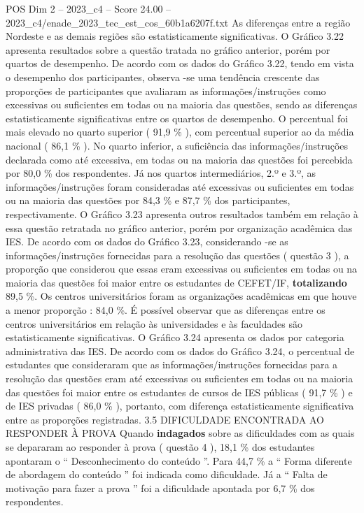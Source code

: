 \begin{textsample}{POS Dim 2 – 2023\_c4 – Score 24.00 – 2023\_c4/enade\_2023\_tec\_est\_cos\_60b1a6207f.txt}
As diferenças entre a região Nordeste e as demais regiões são estatisticamente significativas.
O Gráfico 3.22 apresenta resultados sobre a questão tratada no gráfico anterior, porém por quartos de desempenho.
De acordo com os dados do Gráfico 3.22, tendo em vista o desempenho dos participantes, observa -se uma tendência crescente das proporções de participantes que avaliaram as informações/instruções como excessivas ou suficientes em todas ou na maioria das questões, sendo as diferenças estatisticamente significativas entre os quartos de desempenho.
O percentual foi mais elevado no quarto superior ( 91,9 \% ), com percentual superior ao da média nacional ( 86,1 \% ).
No quarto inferior, a suficiência das informações/instruções declarada como até excessiva, em todas ou na maioria das questões foi percebida por 80,0 \% dos respondentes.
Já nos quartos intermediários, 2.º e 3.º, as informações/instruções foram consideradas até excessivas ou suficientes em todas ou na maioria das questões por 84,3 \% e 87,7 \% dos participantes, respectivamente.
O Gráfico 3.23 apresenta outros resultados também em relação à essa questão retratada no gráfico anterior, porém por organização acadêmica das IES.
De acordo com os dados do Gráfico 3.23, considerando -se as informações/instruções fornecidas para a resolução das questões ( questão 3 ), a proporção que considerou que essas eram excessivas ou suficientes em todas ou na maioria das questões foi maior entre os estudantes de CEFET/IF, \textbf{totalizando} 89,5 \%.
Os centros universitários foram as organizações acadêmicas em que houve a menor proporção : 84,0 \%.
É possível observar que as diferenças entre os centros universitários em relação às universidades e às faculdades são estatisticamente significativas.
O Gráfico 3.24 apresenta os dados por categoria administrativa das IES.
De acordo com os dados do Gráfico 3.24, o percentual de estudantes que consideraram que as informações/instruções fornecidas para a resolução das questões eram até excessivas ou suficientes em todas ou na maioria das questões foi maior entre os estudantes de cursos de IES públicas ( 91,7 \% ) e de IES privadas ( 86,0 \% ), portanto, com diferença estatisticamente significativa entre as proporções registradas. 3.5 DIFICULDADE ENCONTRADA AO RESPONDER À PROVA Quando \textbf{indagados} sobre as dificuldades com as quais se depararam ao responder à prova ( questão 4 ), 18,1 \% dos estudantes apontaram o “ Desconhecimento do conteúdo ”.
Para 44,7 \% a “ Forma diferente de abordagem do conteúdo ” foi indicada como dificuldade.
Já a “ Falta de motivação para fazer a prova ” foi a dificuldade apontada por 6,7 \% dos respondentes.

\end{textsample}
